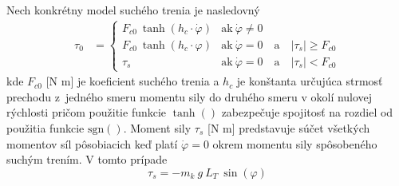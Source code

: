 \documentclass[a4paper, 10pt, ]{article}
\begin{document}
Nech konkrétny model suchého trenia je nasledovný
\begin{align}
    \tau_0 &= 
    \begin{cases} 
        F_{c0} \ \tanh(h_c\cdot \dot \varphi) & \text{ak}   \ \dot \varphi \neq 0  \\
        F_{c0} \ \tanh(h_c\cdot      \varphi) & \text{ak}   \ \dot \varphi = 0 \quad \text{a} \quad \left|\tau_s\right| \geq F_{c0} \\
        \tau_s &  \text{ak}  \ \dot \varphi = 0 \quad \text{a} \quad \left|\tau_s\right| < F_{c0}
    \end{cases}         
\end{align}
kde $F_{c0}$ [N m] je koeficient suchého trenia a $h_c$ je konštanta určujúca strmosť prechodu z~jedného smeru momentu sily do druhého smeru v okolí nulovej rýchlosti pričom použitie funkcie $\tanh()$ zabezpečuje spojitosť na rozdiel od použitia funkcie $\text{sgn}()$. 
Moment sily $\tau_s$ [N m] predstavuje súčet všetkých momentov síl pôsobiacich keď platí $\dot \varphi = 0$ okrem momentu sily spôsobeného suchým trením. V tomto prípade
\begin{equation}
    \tau_s = - m_k \ g \ L_T  \ \sin(\varphi)
\end{equation}
\end{document}
